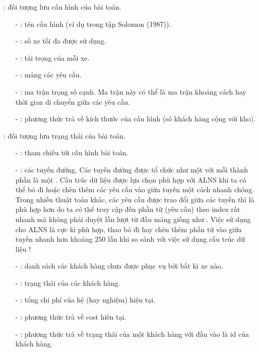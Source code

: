 : đối tượng lưu cấu hình của bài toán.
\begin{itemize}
  \item[-] : tên cấu hình (ví dụ  trong tập Solomon (1987)).
  \item[-] : số xe tối đa được sử dụng.
  \item[-] : tải trọng của mỗi xe.
  \item[-] : mảng các yêu cầu.
  \item[-] : ma trận trọng số cạnh. Ma trận này có thể là ma trận khoảng cách hay thời gian di chuyển giữa các yêu cầu.
  \item[-] : phương thức trả về kích thước của cấu hình (số khách hàng cộng với kho).
\end{itemize}

: đối tượng lưu trạng thái của bài toán.
\begin{itemize}
  \item[-] : tham chiếu tới cấu hình bài toán.
  \item[-] : các tuyến đường. Các tuyến đường được tổ chức như một  với mỗi thành phần là một . Cấu trúc dữ liệu  được lựa chọn phù hợp với ALNS khi ta có thể  bỏ đi hoặc chèn thêm các yêu cầu vào giữa tuyến một cách nhanh chóng. Trong nhiều thuật toán khác, các yêu cầu được trao đổi giữa các tuyến thì  là phù hợp hơn do ta có thể truy cập đến phần từ (yêu cầu) theo index rất nhanh mà không phải duyệt lần lượt từ đầu mảng giống như . Việc sử dụng  cho ALNS là cực kì phù hợp, thao bỏ đi hay chèn thêm phần tử vào giữa tuyến nhanh hơn khoảng $250$ lần khi so sánh với việc sử dụng cấu trúc dữ liệu !
  \item[-] : danh sách các khách hàng chưa được phục vụ bởi bất kì xe nào.
  \item[-] : trạng thái của các khách hàng.
  \item[-] : tổng chi phí của hệ (hay nghiệm) hiện tại.
  \item[-] : phương thức trả về cost hiên tại.
  \item[-] : phương thức trả về trạng thái của một khách hàng với đầu vào là id của khách hàng.
\end{itemize}